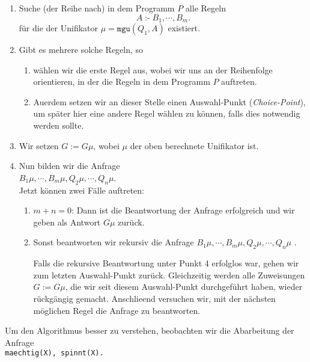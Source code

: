 \begin{enumerate}
\item Suche (der Reihe nach) in dem Programm $P$ alle Regeln        
      \[ A \;\texttt{:-}\; B_1,\cdots,B_m. \] 
      f\"{u}r die der Unifikator $\mu = \texttt{mgu}(Q_1,A)$ existiert.
\item Gibt es mehrere solche Regeln, so
      \begin{enumerate}
      \item w\"{a}hlen wir die erste Regel aus, wobei wir uns an der Reihenfolge orientieren,
            in der die Regeln in dem Programm $P$ auftreten.
      \item Au\3erdem setzen wir an dieser Stelle einen Auswahl-Punkt (\emph{Choice-Point}),
            um sp\"{a}ter hier eine andere Regel w\"{a}hlen zu k\"{o}nnen, falls dies notwendig werden
            sollte.
      \end{enumerate}
\item Wir setzen $G := G\mu$, wobei $\mu$ der oben berechnete Unifikator ist.
\item Nun   bilden wir die  Anfrage \\[0.2cm]
      \hspace*{1.3cm} $B_1\mu, \cdots, B_m\mu, Q_2\mu, \cdots, Q_n\mu$. \\[0.2cm]
      Jetzt k\"{o}nnen zwei F\"{a}lle auftreten: 
      \begin{enumerate}
      \item $m + n = 0$: Dann ist die Beantwortung der Anfrage erfolgreich und wir geben
            als Antwort $G\mu$ zur\"{u}ck.
      \item Sonst beantworten wir rekursiv die Anfrage $B_1\mu, \cdots, B_m\mu, Q_2\mu, \cdots, Q_n\mu$            . 
        
            Falls die rekursive Beantwortung unter Punkt 4 erfolglos war,
            gehen wir zum letzten Auswahl-Punkt  zur\"{u}ck.  Gleichzeitig werden alle Zuweisungen
            $G := G\mu$, die wir seit diesem Auswahl-Punkt durchgef\"{u}hrt haben, wieder r\"{u}ckg\"{a}ngig
            gemacht.  Anschlie\3end versuchen wir, mit der n\"{a}chsten m\"{o}glichen Regel
            die Anfrage zu beantworten.
      \end{enumerate}
\end{enumerate}
Um den Algorithmus besser zu verstehen, beobachten wir die Abarbeitung der Anfrage \\[0.2cm]
\hspace*{1.3cm} \texttt{maechtig(X), spinnt(X).} \\[0.2cm]
